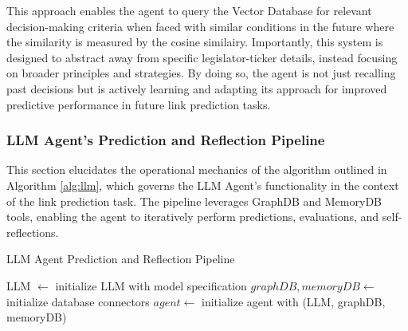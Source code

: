 \documentclass[15pt,letterpaper]{article}
\begin{document}
This approach enables the agent to query the Vector Database for relevant decision-making criteria when faced with similar conditions in the future where the similarity is measured by the cosine similairy. Importantly, this system is designed to abstract away from specific legislator-ticker details, instead focusing on broader principles and strategies. By doing so, the agent is not just recalling past decisions but is actively learning and adapting its approach for improved predictive performance in future link prediction tasks.


\subsubsection{LLM Agent's Prediction and Reflection Pipeline}

This section elucidates the operational mechanics of the algorithm outlined in Algorithm \ref{alg:llm}, which governs the LLM Agent's functionality in the context of the link prediction task. The pipeline leverages GraphDB and MemoryDB tools, enabling the agent to iteratively perform predictions, evaluations, and self-reflections.

\vspace{5mm} %

\begin{algorithm}[H]
  \caption{LLM Agent Prediction and Reflection Pipeline}
  \label{alg:llm}
  \SetAlgoLined
  LLM $\leftarrow$ initialize LLM with model specification\;
  $graphDB, memoryDB \leftarrow$ initialize database connectors\;
  $agent \leftarrow$ initialize agent with (LLM, graphDB, memoryDB)\;
  
  \end{algorithm}

\vspace{5mm} %
\end{document}
